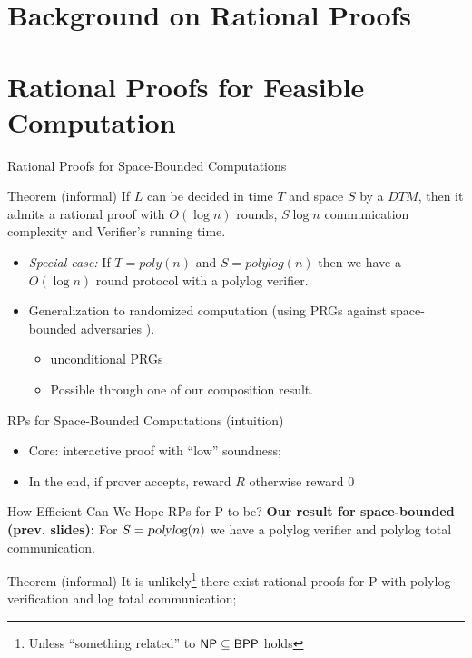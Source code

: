 \section{Background on Rational Proofs}


\section{Rational Proofs for Feasible Computation}

\begin{frame}{Rational Proofs for Space-Bounded Computations}
\begin{block}{Theorem (informal)}
	If $L$ can be decided in time $T$ and space $S$ by a $DTM$, then it admits a rational proof with $O(\log n)$ rounds, $S \log n$ communication complexity and Verifier's running time.
\end{block}
\pause
\begin{itemize}[<+->]
	\item \textit{Special case:} If $T=poly(n)$ and $S=polylog(n)$ then we have a $O(\log n)$ round protocol with a polylog verifier.
	\item Generalization to randomized computation (using PRGs against space-bounded adversaries \cite{nisan1992pseudorandom}).
	\begin{itemize}
		\item unconditional PRGs
		\item Possible through one of our composition result.
	\end{itemize}
\end{itemize}
\end{frame}

\begin{frame}{RPs for Space-Bounded Computations (intuition)}
\begin{itemize}
	\item Core: interactive proof with ``low'' soundness;\pause
	\item In the end, if prover accepts, reward $R$ otherwise reward $0$
\end{itemize}
\end{frame}

\begin{frame}{How Efficient Can We Hope RPs for P to be?}
	\textbf{Our result for space-bounded (prev. slides):} For $S = {\textsl{polylog}}(n)$ we have a polylog verifier and polylog total communication.
	\pause
	\begin{block}{Theorem (informal)}
It is unlikely\footnote{Unless ``something related'' to ${\mathsf{NP}} \subseteq {\ensuremath{\mathsf{BPP}}}$ holds} there exist rational proofs for P with polylog verification and log total communication;
\end{block}
\end{frame}

